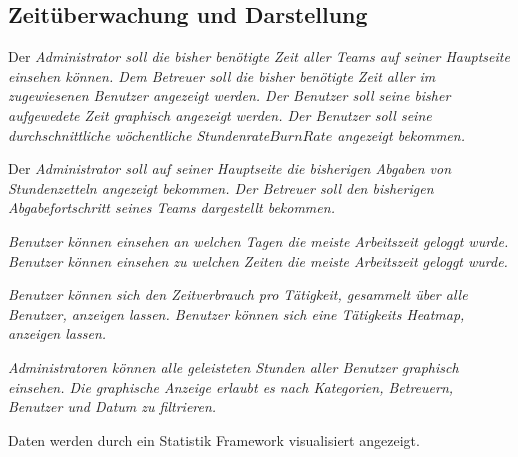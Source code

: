 \subsection{Zeitüberwachung und Darstellung}
    \begin{requirements}
        \begin{requirements}
             Der \em{Administrator} soll die bisher benötigte Zeit aller \em{Teams} auf seiner \em{Hauptseite} einsehen können.
             Dem \em{Betreuer} soll die bisher benötigte Zeit aller im zugewiesenen \em{Benutzer} angezeigt werden.
             Der \em{Benutzer} soll seine bisher aufgewedete Zeit graphisch angezeigt werden.
             Der \em{Benutzer} soll seine durchschnittliche wöchentliche Stundenrate\(Burn Rate\) angezeigt bekommen.
        \end{requirements}

        \begin{requirements}
             Der \em{Administrator} soll auf seiner \em{Hauptseite} die bisherigen \em{Abgaben} von \em{Stundenzetteln} angezeigt bekommen.
             Der \em{Betreuer} soll den bisherigen Abgabefortschritt seines \em{Teams} dargestellt bekommen.
        \end{requirements}

        \begin{requirements}
             \em{Benutzer} können einsehen an welchen Tagen die meiste Arbeitszeit geloggt wurde.
             \em{Benutzer} können einsehen zu welchen Zeiten die meiste Arbeitszeit geloggt wurde.
        \end{requirements}

        \begin{requirements}
             \em{Benutzer} können sich den Zeitverbrauch pro Tätigkeit, gesammelt über alle \em{Benutzer}, anzeigen lassen.
             \em{Benutzer} können sich eine Tätigkeits \em{Heatmap}, anzeigen lassen.
        \end{requirements}
        
        \begin{requirements}
              \em{Administratoren} können alle geleisteten Stunden aller \em{Benutzer} graphisch einsehen.
              Die graphische Anzeige erlaubt es nach \em{Kategorien}, \em{Betreuern}, \em{Benutzer} und Datum zu filtrieren.
        \end{requirements}

        Daten werden durch ein Statistik Framework visualisiert angezeigt.
    \end{requirements}

